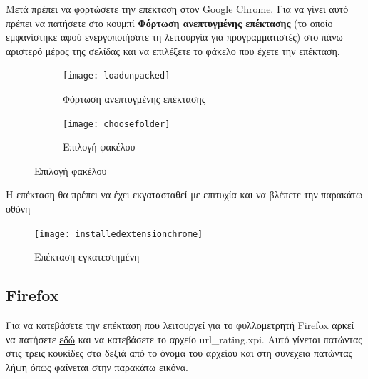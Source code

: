 \documentclass{article}
\begin{document}
Μετά πρέπει να φορτώσετε την επέκταση στον Google Chrome. Για να γίνει αυτό πρέπει να πατήσετε στο κουμπί \textbf{Φόρτωση ανεπτυγμένης επέκτασης} (το οποίο εμφανίστηκε αφού ενεργοποιήσατε τη λειτουργία για προγραμματιστές) στο πάνω αριστερό μέρος της σελίδας και να επιλέξετε το φάκελο που έχετε την επέκταση.
\begin{figure}[H]
    \centering
    \begin{minipage}[t]{0.45\textwidth}
        \centering
        \begin{subfigure}[t]{\textwidth}
            \texttt{[image: loadunpacked]}
        \caption{Φόρτωση ανεπτυγμένης επέκτασης}
        \label{Fig:loadunpacked}
        \end{subfigure}
        \vspace{\fill}
    \end{minipage}
    \hfill
    \begin{minipage}{0.45\textwidth}
        \begin{subfigure}{\textwidth}
            \texttt{[image: choosefolder]}
            \caption{Επιλογή φακέλου}
            \label{Fig:choosefolder}
        \end{subfigure}
    \end{minipage}
\end{figure}

Η επέκταση θα πρέπει να έχει εκγατασταθεί με επιτυχία και να βλέπετε την παρακάτω οθόνη
\begin{figure}[H]
    \texttt{[image: installedextensionchrome]}
    \caption*{Επέκταση εγκατεστημένη}
\end{figure}

\cleardoublepage
{}
\subsection*{Firefox}

Για να κατεβάσετε την επέκταση που λειτουργεί για το φυλλομετρητή Firefox αρκεί να πατήσετε \href{https://drive.google.com/drive/folders/191-K02IJk3PNCtMcF94pB9eTDhVBnS2K?usp=share_link}{εδώ} και να κατεβάσετε το αρχείο url\_rating.xpi. Αυτό γίνεται πατώντας στις τρεις κουκίδες στα δεξιά από το όνομα του αρχείου και στη συνέχεια πατώντας λήψη όπως φαίνεται στην παρακάτω εικόνα.
\end{document}
